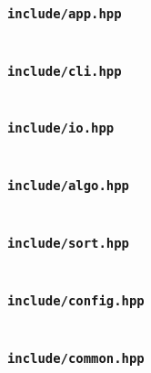 \documentclass[12pt, a4paper]{ctexart}
\begin{document}
\subsubsection{\texttt{include/app.hpp}}
\inputminted{cpp}{../include/app.hpp}

\subsubsection{\texttt{include/cli.hpp}}
\inputminted{cpp}{../include/cli.hpp}

\subsubsection{\texttt{include/io.hpp}}
\inputminted{cpp}{../include/io.hpp}

\subsubsection{\texttt{include/algo.hpp}}
\inputminted{cpp}{../include/algo.hpp}

\subsubsection{\texttt{include/sort.hpp}}
\inputminted{cpp}{../include/sort.hpp}

\subsubsection{\texttt{include/config.hpp}}
\inputminted{cpp}{../include/config.hpp}

\subsubsection{\texttt{include/common.hpp}}
\inputminted{cpp}{../include/common.hpp}
\end{document}
